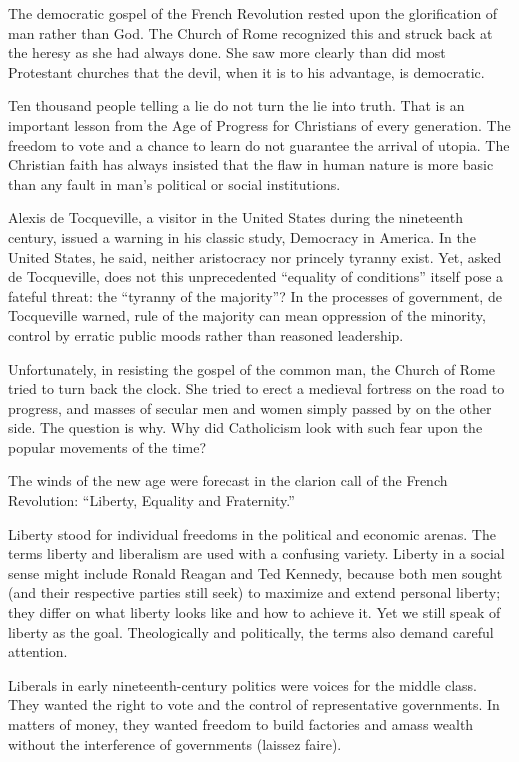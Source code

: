 The democratic gospel of the French Revolution rested upon the glorification of man rather than God.
The Church of Rome recognized this and struck back at the heresy as she had always done. She saw
more clearly than did most Protestant churches that the devil, when it is to his advantage, is
democratic.

Ten thousand people telling a lie do not turn the lie into truth. That is an important lesson from
the Age of Progress for Christians of every generation. The freedom to vote and a chance to learn do
not guarantee the arrival of utopia. The Christian faith has always insisted that the flaw in human
nature is more basic than any fault in man’s political or social institutions.

Alexis de Tocqueville, a visitor in the United States during the nineteenth century, issued a
warning in his classic study, Democracy in America. In the United States, he said, neither
aristocracy nor princely tyranny exist. Yet, asked de Tocqueville, does not this unprecedented
“equality of conditions” itself pose a fateful threat: the “tyranny of the majority”? In the
processes of government, de Tocqueville warned, rule of the majority can mean oppression of the
minority, control by erratic public moods rather than reasoned leadership.

Unfortunately, in resisting the gospel of the common man, the Church of Rome tried to turn back the
clock. She tried to erect a medieval fortress on the road to progress, and masses of secular men and
women simply passed by on the other side. The question is why. Why did Catholicism look with such
fear upon the popular movements of the time?

The winds of the new age were forecast in the clarion call of the French Revolution: “Liberty,
Equality and Fraternity.”

Liberty stood for individual freedoms in the political and economic arenas. The terms liberty and
liberalism are used with a confusing variety. Liberty in a social sense might include Ronald Reagan
and Ted Kennedy, because both men sought (and their respective parties still seek) to maximize and
extend personal liberty; they differ on what liberty looks like and how to achieve it. Yet we still
speak of liberty as the goal. Theologically and politically, the terms also demand careful
attention.

Liberals in early nineteenth-century politics were voices for the middle class. They wanted the
right to vote and the control of representative governments. In matters of money, they wanted
freedom to build factories and amass wealth without the interference of governments (laissez faire).

